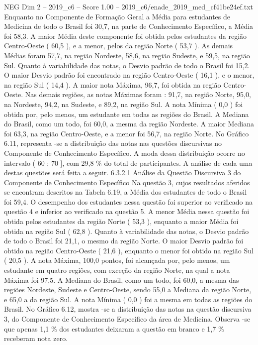 \begin{textsample}{NEG Dim 2 – 2019\_c6 – Score 1.00 – 2019\_c6/enade\_2019\_med\_cf41be24ef.txt}
Enquanto no Componente de Formação Geral a Média para estudantes de Medicina de todo o Brasil foi 30,7, na parte de Conhecimento Específico, a Média foi 58,3.
A maior Média deste componente foi obtida pelos estudantes da região Centro-Oeste ( 60,5 ), e a menor, pelos da região Norte ( 53,7 ).
As demais Médias foram 57,7, na região Nordeste, 58,6, na região Sudeste, e 59,5, na região Sul.
Quanto à variabilidade das notas, o Desvio padrão de todo o Brasil foi 15,2.
O maior Desvio padrão foi encontrado na região Centro-Oeste ( 16,1 ), e o menor, na região Sul ( 14,4 ).
A maior nota Máxima, 96,7, foi obtida na região Centro-Oeste.
Nas demais regiões, as notas Máximas foram : 91,7, na região Norte, 95,0, na Nordeste, 94,2, na Sudeste, e 89,2, na região Sul.
A nota Mínima ( 0,0 ) foi obtida por, pelo menos, um estudante em todas as regiões do Brasil.
A Mediana do Brasil, como um todo, foi 60,0, a mesma da região Nordeste.
A maior Mediana foi 63,3, na região Centro-Oeste, e a menor foi 56,7, na região Norte.
No Gráfico 6.11, representa -se a distribuição das notas nas questões discursivas no Componente de Conhecimento Específico.
A moda dessa distribuição ocorre no intervalo ( 60 ; 70 ], com 29,8 \% do total de participantes.
A análise de cada uma destas questões será feita a seguir. 6.3.2.1 Análise da Questão Discursiva 3 do Componente de Conhecimento Específico Na questão 3, cujos resultados aferidos se encontram descritos na Tabela 6.19, a Média dos estudantes de todo o Brasil foi 59,4.
O desempenho dos estudantes nessa questão foi superior ao verificado na questão 4 e inferior ao verificado na questão 5.
A menor Média nessa questão foi obtida pelos estudantes da região Norte ( 53,3 ), enquanto a maior Média foi obtida na região Sul ( 62,8 ).
Quanto à variabilidade das notas, o Desvio padrão de todo o Brasil foi 21,1, o mesmo da região Norte.
O maior Desvio padrão foi obtido na região Centro-Oeste ( 21,6 ), enquanto o menor foi obtido na região Sul ( 20,5 ).
A nota Máxima, 100,0 pontos, foi alcançada por, pelo menos, um estudante em quatro regiões, com exceção da região Norte, na qual a nota Máxima foi 97,5.
A Mediana do Brasil, como um todo, foi 60,0, a mesma das regiões Nordeste, Sudeste e Centro-Oeste, sendo 55,0 a Mediana da região Norte, e 65,0 a da região Sul.
A nota Mínima ( 0,0 ) foi a mesma em todas as regiões do Brasil.
No Gráfico 6.12, mostra -se a distribuição das notas na questão discursiva 3, do Componente de Conhecimento Específico da área de Medicina.
Observa -se que apenas 1,1 \% dos estudantes deixaram a questão em branco e 1,7 \% receberam nota zero.

\end{textsample}

